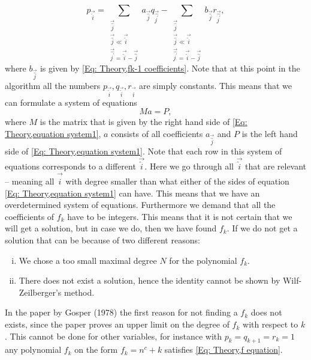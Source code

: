 \begin{equation}\label{Eq: Theory,equation system1}
  p_\vec{\hat{i}} = \sum_{\substack{\vec{\hat{j}}\\\vec{\hat{j}}\ll\vec{\hat{i}}\\\vec{\hat{j^\prime}}=\vec{\hat{i}}-\vec{\hat{j}}}} a_{\vec{\hat{j}}}q_{\vec{\hat{j^\prime}}} - \sum_{\substack{\vec{\hat{j}}\\\vec{\hat{j}}\ll\vec{\hat{i}}\\\vec{\hat{j^\prime}}=\vec{\hat{i}}-\vec{\hat{j}}}} b_{\vec{\hat{j}}}r_{\vec{\hat{j^\prime}}},
\end{equation}
where $b_{\vec{\hat{j}}}$ is given by \ref{Eq: Theory,fk-1 coefficients}. Note that at this point in the algorithm all the numbers $p_\vec{\hat{i}},q_\vec{\hat{i}},r_\vec{\hat{i}}$ are simply constants. This means that we can formulate a system of equations
\begin{equation}\label{Eq: Theory,equation system2}
  Ma=P,
\end{equation}
where $M$ is the matrix that is given by the right hand side of \ref{Eq: Theory,equation system1}, $a$ consists of all coefficients $a_{\vec{\hat{j}}}$ and $P$ is the left hand side of \ref{Eq: Theory,equation system1}. Note that each row in this system of equations corresponds to a different $\vec{\hat{i}}$. Here we go through all $\vec{\hat{i}}$ that are relevant -- meaning all $\vec{\hat{i}}$ with degree smaller than what either of the sides of equation \ref{Eq: Theory,equation system1} can have. This means that we have an overdetermined system of equations. Furthermore we demand that all the coefficients of $f_k$ have to be integers. This means that it is not certain that we will get a solution, but in case we do, then we have found $f_k$. If we do not get a solution that can be because of two different reasons:
\begin{enumerate}[i)]
  \item We chose a too small maximal degree $N$ for the polynomial $f_k$.
  \item There does not exist a solution, hence the identity cannot be shown by Wilf-Zeilberger's method.
\end{enumerate}
In the paper by Gosper (1978) the first reason for not finding a $f_k$ does not exists, since the paper proves an upper limit on the degree of $f_k$ with respect to $k$. This cannot be done for other variables, for instance with $p_k=q_{k+1}=r_k=1$ any polynomial $f_k$ on the form $f_k=n^c+k$ satisfies \ref{Eq: Theory,f equation}.

